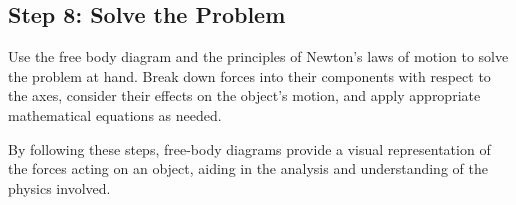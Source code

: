 \documentclass[11pt]{article}
\begin{document}
\subsection*{Step 8: Solve the Problem}

Use the free body diagram and the principles of Newton's laws of motion to solve the problem at hand. Break down forces into their components with respect to the axes, consider their effects on the object's motion, and apply appropriate mathematical equations as needed.

By following these steps, free-body diagrams provide a visual representation of the forces acting on an object, aiding in the analysis and understanding of the physics involved.
\end{document}
